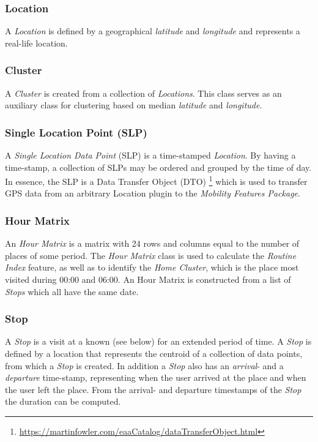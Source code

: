 \subsubsection*{Location}
A \textit{Location} is defined by a geographical \textit{latitude} and \textit{longitude} and represents a real-life location.

\subsubsection*{Cluster}
A \textit{Cluster} is created from a collection of \textit{Locations}. This class serves as an auxiliary class for clustering based on median \textit{latitude} and \textit{longitude}.

\subsubsection*{Single Location Point (SLP)}
A \textit{Single Location Data Point} (SLP) is a time-stamped \textit{Location}. By having a time-stamp, a collection of SLPs may be ordered and grouped by the time of day. In essence, the SLP is a Data Transfer Object (DTO) \footnote{\url{https://martinfowler.com/eaaCatalog/dataTransferObject.html}} which is used to transfer GPS data from an arbitrary Location plugin to the \textit{Mobility Features Package}.

\subsubsection*{Hour Matrix}
An \textit{Hour Matrix} is a matrix with 24 rows and columns equal to the number of places of some period. The \textit{Hour Matrix} class is used to calculate the \textit{Routine Index} feature, as well as to identify the \textit{Home Cluster}, which is the place most visited during 00:00 and 06:00. An Hour Matrix is constructed from a list of \textit{Stops} which all have the same date.

\subsubsection*{Stop}
A \textit{Stop} is a visit at a known  (see below) for an extended period of time. A \textit{Stop} is defined by a location that represents the centroid of a collection of data points, from which a \textit{Stop} is created. In addition a \textit{Stop} also has an \textit{arrival}- and a \textit{departure} time-stamp, representing when the user arrived at the place and when the user left the place. From the arrival- and departure timestamps of the \textit{Stop} the duration can be computed.

